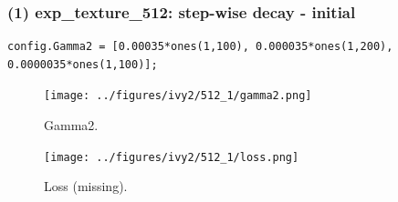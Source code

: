 \documentclass[letter]{article}
\begin{document}
\newpage

\subsubsection*{(1) exp\_texture\_512: step-wise decay - initial}

\begin{lstlisting}
config.Gamma2 = [0.00035*ones(1,100), 0.000035*ones(1,200), 0.0000035*ones(1,100)];
\end{lstlisting}

\begin{figure}[h!]
\centering
\texttt{[image: ../figures/ivy2/512\_1/gamma2.png]}
\caption{\label{fig:gamma1}Gamma2.}
\end{figure}

\begin{figure}[h!]
	\centering
	\texttt{[image: ../figures/ivy2/512\_1/loss.png]}
	\caption{\label{fig:gamma1}Loss (missing).}
\end{figure}

\newpage
\end{document}
